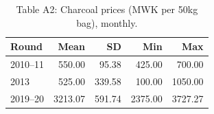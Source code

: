 \begin{table}[ht]
\centering
\caption{Table A2: Charcoal prices (MWK per 50kg bag), monthly.} 
\label{tab:A2_charcoal}
\begin{tabular}{lrrrr}
  \hline
Round & Mean & SD & Min & Max \\ 
  \hline
2010--11 & 550.00 & 95.38 & 425.00 & 700.00 \\ 
  2013 & 525.00 & 339.58 & 100.00 & 1050.00 \\ 
  2019--20 & 3213.07 & 591.74 & 2375.00 & 3727.27 \\ 
   \hline
\end{tabular}
\end{table}
